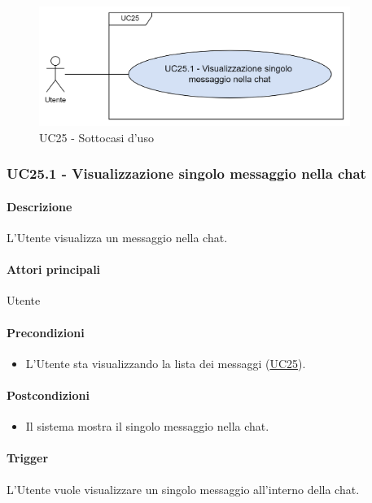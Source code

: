 \begin{figure}[H]
  \centering
  \includegraphics[width=0.90\textwidth]{assets/uc25.png}
  \caption{UC25 - Sottocasi d'uso}
\end{figure}


\subsubsection{UC25.1 - Visualizzazione singolo messaggio nella chat}\label{UC25point1}
\paragraph*{Descrizione}
L'Utente visualizza un messaggio nella chat.

\paragraph*{Attori principali}
Utente

\paragraph*{Precondizioni}
\begin{itemize}
  \item L'Utente sta visualizzando la lista dei messaggi (\hyperref[UC25]{UC25}).
\end{itemize}

\paragraph*{Postcondizioni}
\begin{itemize}
  \item Il sistema mostra il singolo messaggio nella chat.
\end{itemize}

\paragraph*{Trigger}
L'Utente vuole visualizzare un singolo messaggio all'interno della chat.

